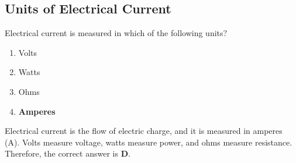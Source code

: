 \subsection{Units of Electrical Current}
\label{T5A01}

\begin{tcolorbox}[colback=gray!10!white,colframe=black!75!black,title=T5A01]
Electrical current is measured in which of the following units?
\begin{enumerate}[noitemsep]
    \item Volts
    \item Watts
    \item Ohms
    \item \textbf{Amperes}
\end{enumerate}
\end{tcolorbox}

Electrical current is the flow of electric charge, and it is measured in amperes (A). Volts measure voltage, watts measure power, and ohms measure resistance. Therefore, the correct answer is \textbf{D}.